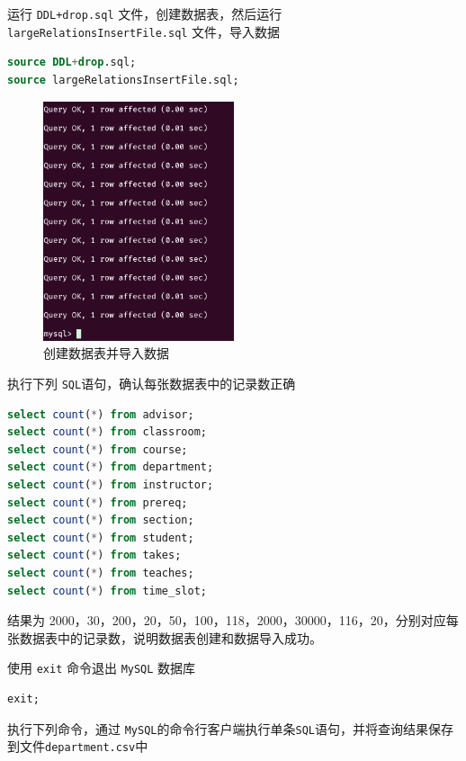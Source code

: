 \documentclass{article}
\begin{document}
运行 \texttt{DDL+drop.sql} 文件，创建数据表，然后运行 \texttt{ largeRelationsInsertFile.sql} 文件，导入数据

\begin{lstlisting}[language=sql]
source DDL+drop.sql;
source largeRelationsInsertFile.sql;
\end{lstlisting}

\begin{figure}[H]
\centering
\includegraphics[width=0.5\textwidth]{img/5.png}
\caption{创建数据表并导入数据}
\end{figure}

执行下列 \texttt{SQL}语句，确认每张数据表中的记录数正确

\begin{lstlisting}[language=sql]
select count(*) from advisor;
select count(*) from classroom;
select count(*) from course;
select count(*) from department;
select count(*) from instructor;
select count(*) from prereq;
select count(*) from section;
select count(*) from student;
select count(*) from takes;
select count(*) from teaches;
select count(*) from time_slot;
\end{lstlisting}

结果为 2000，30，200，20，50，100，118，2000，30000，116，20，分别对应每张数据表中的记录数，说明数据表创建和数据导入成功。

使用 \texttt{exit} 命令退出 \texttt{MySQL} 数据库

\begin{lstlisting}[language=sql]
exit;
\end{lstlisting}

执行下列命令，通过 \texttt{MySQL}的命令行客户端执行单条\texttt{SQL}语句，并将查询结果保存到文件\texttt{department.csv}中
\end{document}
